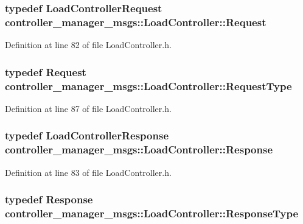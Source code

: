 \subsubsection[{\-Request}]{\setlength{\rightskip}{0pt plus 5cm}typedef {\bf \-Load\-Controller\-Request} {\bf controller\-\_\-manager\-\_\-msgs\-::\-Load\-Controller\-::\-Request}}\label{structcontroller__manager__msgs_1_1LoadController_ab95989476da0c4c8f9442d0f0844f529}


\-Definition at line 82 of file \-Load\-Controller.\-h.

\subsubsection[{\-Request\-Type}]{\setlength{\rightskip}{0pt plus 5cm}typedef {\bf \-Request} {\bf controller\-\_\-manager\-\_\-msgs\-::\-Load\-Controller\-::\-Request\-Type}}\label{structcontroller__manager__msgs_1_1LoadController_a34f322c3e80d0f32cfb41a09d60cf7b6}


\-Definition at line 87 of file \-Load\-Controller.\-h.

\subsubsection[{\-Response}]{\setlength{\rightskip}{0pt plus 5cm}typedef {\bf \-Load\-Controller\-Response} {\bf controller\-\_\-manager\-\_\-msgs\-::\-Load\-Controller\-::\-Response}}\label{structcontroller__manager__msgs_1_1LoadController_ac340d44518f5dd108858ae4b64c58392}


\-Definition at line 83 of file \-Load\-Controller.\-h.

\subsubsection[{\-Response\-Type}]{\setlength{\rightskip}{0pt plus 5cm}typedef {\bf \-Response} {\bf controller\-\_\-manager\-\_\-msgs\-::\-Load\-Controller\-::\-Response\-Type}}\label{structcontroller__manager__msgs_1_1LoadController_abec99d72030c0d37a122dd23b4da2cf5}


